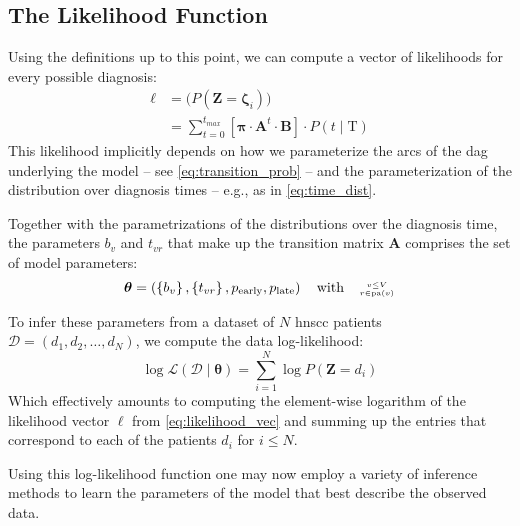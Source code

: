 \documentclass[twocolumn]{aastex631}
\begin{document}
\subsection{The Likelihood Function}
\label{subsec:formalism:likelihood}

Using the definitions up to this point, we can compute a vector of likelihoods for every possible diagnosis:
%
\begin{equation} \label{eq:likelihood_vec}
\begin{split}
    \boldsymbol{\ell} &= \big( P\left( \mathbf{Z} = \boldsymbol{\zeta}_i \right) \big) \\
    &= \sum_{t=0}^{t_{max}} \left[ \boldsymbol{\pi} \cdot \mathbf{A}^t \cdot \mathbf{B} \right] \cdot P \left( t \mid \text{T} \right)
\end{split}
\end{equation}
%
This likelihood implicitly depends on how we parameterize the arcs of the \gls{dag} underlying the model -- see \cref{eq:transition_prob} -- and the parameterization of the distribution over diagnosis times -- e.g., as in \cref{eq:time_dist}. 

Together with the parametrizations of the distributions over the diagnosis time, the parameters $b_v$ and $t_{vr}$ that make up the transition matrix $\mathbf{A}$ comprises the set of model parameters:
%
\begin{equation}
    \boldsymbol{\theta} = \left( \left\{ b_v \right\}, \left\{ t_{vr} \right\}, p_\text{early}, p_\text{late} \right) \quad \text{with} \quad \genfrac{}{}{0pt}{2}{v\leq V}{r\in\operatorname{pa}(v)}
\end{equation}

To infer these parameters from a dataset of $N$ \gls{hnscc} patients $\boldsymbol{\mathcal{D}} = \left( d_1, d_2, \ldots, d_N \right)$, we compute the data log-likelihood:
%
\begin{equation} \label{eq:log_likelihood}
    \log\mathcal{L} \left( \boldsymbol{\mathcal{D}} \mid \boldsymbol{\theta} \right) = \sum_{i=1}^N \log P \left( \mathbf{Z} = d_i \right)
\end{equation}
%
Which effectively amounts to computing the element-wise logarithm of the likelihood vector $\boldsymbol{\ell}$ from \cref{eq:likelihood_vec} and summing up the entries that correspond to each of the patients $d_i$ for $i\leq N$. 

Using this log-likelihood function one may now employ a variety of inference methods to learn the parameters of the model that best describe the observed data.
\end{document}
